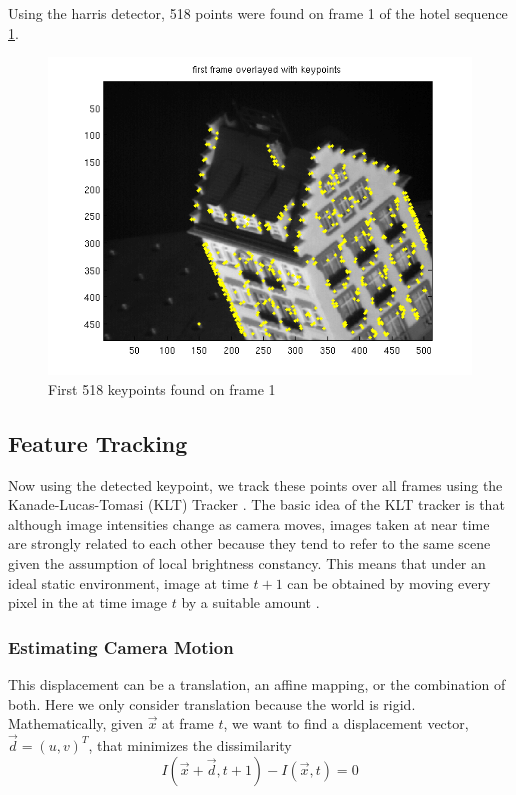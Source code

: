 Using the harris detector, 518 points were found on frame 1 of the hotel
sequence \ref{fig:keypoints}.
\begin{figure}[!ht]
  \begin{center}
  \includegraphics[scale=0.75]{keypoints.png}
  \caption{First 518 keypoints found on frame 1} 
  \label{fig:keypoints}
  \end{center}
\end{figure}

\subsection{Feature Tracking}
\label{sec:feature-tracking}
Now using the detected keypoint, we track these points over all frames
using the Kanade-Lucas-Tomasi (KLT) Tracker \cite{KLT}.
The basic idea of the KLT tracker is that although image intensities change as
camera moves, images taken at near time are strongly related to each
other because they tend to refer to the same scene given the
assumption of local brightness constancy. This means that under an ideal
static environment, image at time $t+1$ can be obtained by moving
every pixel in the at time image $t$ by a suitable amount \cite{shi}. 

\subsubsection{Estimating Camera Motion}
This displacement can be a translation, an affine mapping, or
the combination of both. Here we only consider translation because the world is rigid. Mathematically, given $\vec x$ at frame $t$, we
want to find a displacement vector, $\vec d=(u,v)^T$, that minimizes
the dissimilarity
\begin{equation}
  \label{eq:1}
 I(\vec x + \vec d, t+1) - I(\vec x, t) = 0
\end{equation}

